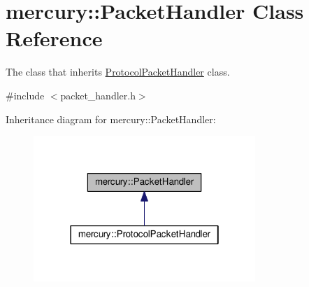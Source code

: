 \hypertarget{classmercury_1_1_packet_handler}{}\section{mercury\+:\+:Packet\+Handler Class Reference}
\label{classmercury_1_1_packet_handler}


The class that inherits \hyperlink{classmercury_1_1_protocol_packet_handler}{Protocol\+Packet\+Handler} class.  




{\ttfamily \#include $<$packet\+\_\+handler.\+h$>$}



Inheritance diagram for mercury\+:\+:Packet\+Handler\+:
\nopagebreak
\begin{figure}[H]
\begin{center}
\leavevmode
\includegraphics[width=238pt]{classmercury_1_1_packet_handler__inherit__graph}
\end{center}
\end{figure}
